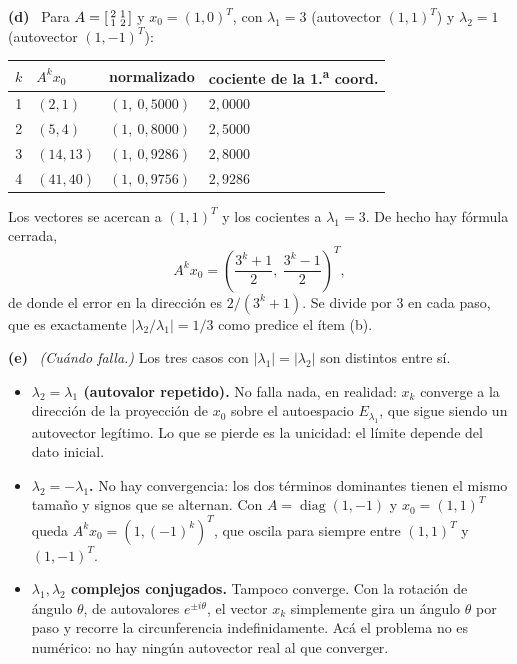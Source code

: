 \documentclass[11pt,a4paper]{article}
\newcommand{\bi}[1]{\boldsymbol{#1}}
\newcommand{\n}[1]{\boldsymbol{#1}}
\DeclareMathOperator{\gen}{span}
\DeclareMathOperator{\tr}{tr}
\DeclareMathOperator{\rg}{rg}
\DeclareMathOperator{\diag}{diag}
\def\n#1{#1}\def\bi#1{#1}\def\rg{rg}\def\tr{tr}\def\gen{span}%
\newcommand{\itemsol}[1]{\par\medskip\noindent\textbf{(#1)}\ \ignorespaces}
\begin{document}
\itemsol{d} Para $A=\begin{bsmallmatrix}2&1\\1&2\end{bsmallmatrix}$ y
$\n x_0=(1,0)^T$, con $\lambda_1=3$ (autovector $(1,1)^T$) y $\lambda_2=1$
(autovector $(1,-1)^T$):
\begin{center}
\begin{tabular}{@{}rlll@{}}
\hline
$k$ & $A^k\n x_0$ & normalizado & cociente de la 1.\textsuperscript{a} coord.\\
\hline
1 & $(2,1)$ & $(1,\ 0{,}5000)$ & $2{,}0000$\\
2 & $(5,4)$ & $(1,\ 0{,}8000)$ & $2{,}5000$\\
3 & $(14,13)$ & $(1,\ 0{,}9286)$ & $2{,}8000$\\
4 & $(41,40)$ & $(1,\ 0{,}9756)$ & $2{,}9286$\\
\hline
\end{tabular}
\end{center}
Los vectores se acercan a $(1,1)^T$ y los cocientes a $\lambda_1=3$. De hecho hay
fórmula cerrada,
\[
A^k\n x_0=\left(\frac{3^{k}+1}{2},\ \frac{3^{k}-1}{2}\right)^{T},
\]
de donde el error en la dirección es $2/(3^k+1)$. Se divide por $3$ en cada paso,
que es exactamente $|\lambda_2/\lambda_1|=1/3$ como predice el ítem (b).

\itemsol{e} \emph{(Cuándo falla.)} Los tres casos con
$|\lambda_1|=|\lambda_2|$ son distintos entre sí.
\begin{itemize}[itemsep=2pt,topsep=3pt]
\item \textbf{$\lambda_2=\lambda_1$ (autovalor repetido).} No falla nada, en
realidad: $\n x_k$ converge a la dirección de la proyección de $\n x_0$ sobre el
autoespacio $E_{\lambda_1}$, que sigue siendo un autovector legítimo. Lo que se
pierde es la unicidad: el límite depende del dato inicial.
\item \textbf{$\lambda_2=-\lambda_1$.} No hay convergencia: los dos términos
dominantes tienen el mismo tamaño y signos que se alternan. Con $A=\diag(1,-1)$
y $\n x_0=(1,1)^T$ queda $A^k\n x_0=(1,(-1)^k)^T$, que oscila para siempre entre
$(1,1)^T$ y $(1,-1)^T$.
\item \textbf{$\lambda_1,\lambda_2$ complejos conjugados.} Tampoco converge. Con
la rotación de ángulo $\theta$, de autovalores $e^{\pm i\theta}$, el vector
$\n x_k$ simplemente gira un ángulo $\theta$ por paso y recorre la
circunferencia indefinidamente. Acá el problema no es numérico: no hay ningún
autovector real al que converger.
\end{itemize}
\end{document}
